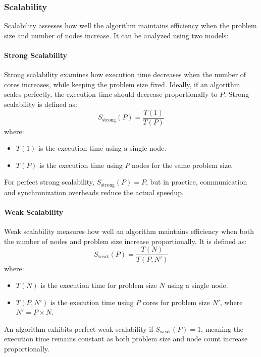 \subsubsection{Scalability}
Scalability assesses how well the algorithm maintains efficiency when the problem size and number of nodes increase. It can be analyzed using two models:

\paragraph{Strong Scalability}
Strong scalability examines how execution time decreases when the number of cores increases, while keeping the problem size fixed. Ideally, if an algorithm scales perfectly, the execution time should decrease proportionally to \( P \). Strong scalability is defined as:
\begin{equation}
    S_{\text{strong}}(P) = \frac{T(1)}{T(P)}
\end{equation}
where:
\begin{itemize}
    \item \( T(1) \) is the execution time using a single node.
    \item \( T(P) \) is the execution time using \( P \) nodes for the same problem size.
\end{itemize}
For perfect strong scalability, \( S_{\text{strong}}(P) = P \), but in practice, communication and synchronization overheads reduce the actual speedup.

\paragraph{Weak Scalability}
Weak scalability measures how well an algorithm maintains efficiency when both the number of nodes and problem size increase proportionally. It is defined as:
\begin{equation}
    S_{\text{weak}}(P) = \frac{T(N)}{T(P, N')}
\end{equation}
where:
\begin{itemize}
    \item \( T(N) \) is the execution time for problem size \( N \) using a single node.
    \item \( T(P, N') \) is the execution time using \( P \) cores for problem size \( N' \), where \( N' = P \times N \).
\end{itemize}
An algorithm exhibits perfect weak scalability if \( S_{\text{weak}}(P) = 1 \), meaning the execution time remains constant as both problem size and node count increase proportionally.



